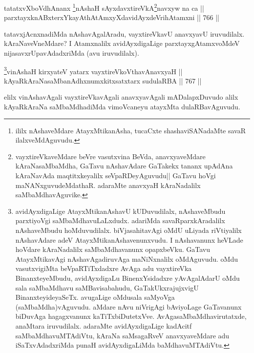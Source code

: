 
\begin{shl}
tatatxvXboVdhAnanx \footnote{ililx nAshaveMdare AtayxMtikanAsha, tucaCxte shashaviSANadaMte savaR ilalxveMdAguvudu.}nAshaH sAyxdavxtireVkA\footnote{vayxtireVkaveMdare beVre vasutxvina BeVda, anavxyaveMdare kAraNasaMbaMdha, GaTavu nAshavAdare GaTakekx tananx upAdAna kAraNavAda maqtitxkeyalilx seVpaRDeyAguvudu|| GaTavu hoVgi maNANxguvudeMdathaR. adaraMte anavxyaH kAraNadalilx saMbaMdhavAguvike.}navxyw na ca || \\
parxtayxknABxterxYkayAthAtAmxyXdavidAyxdeVrihA\s \s tamxni \hfill || 766 ||  
\end{shl}

\begin{artha} 
tatavxjAcnxnadiMda nAshavAgalAradu, vayxtireVkavU anavxyavU iruvudilalx. kAraNaveVneMdare? I Atamxnalilx avidAyxdigaLige parxtayxgAtamxvoMdeV nijasavxrUpavAdadxriMda (avu iruvudilalx).
\end{artha}


\begin{shl}
\footnote{avidAyxdigaLige AtayxMtikanAshavU kUDuvudilalx, nAshaveMbudu parxtiyoVgi saMbaMdhavuLaLxdudx. adariMda savaRparxkAradalilx nAshaveMbudu hoMduvudilalx. biVjasahitavAgi oMdU uLiyada riVtiyalilx nAshavAdare adeV AtayxMtikanAshavenunxvudu. I nAshavanunx heVLade hoVdare kAraNadalilx saMbaMdhavanunx opapxbeVku. GaTavu AtayxMtikavAgi nAshavAgadiruvAga maNiNxnalilx oMdAguvudu. oMdu vasutxvigiMta beVpaRTiTxdadxre AvAga adu vayxtireVka BinanxteyeMbudu, avidAyxdigaLu BinenxYsidadxre yAvAgalAdarU oMdu sala saMbaMdhavu saMBavisabahudu, GaTakUkx\break rajujxvigU BinanxteyideyaSeTx. avugaLige oMdusala saMyoVga (saMbaMdha)vAguvudu. aMdare nAvu niVrigAgi bAviyoLage GaTavanunx biDuvAga hagagxvanunx kaTiTxbiDutetxVve. AvAga\break saMbaMdhavirutatxde, anaMtara iruvudilalx. adaraMte avidAyxdigaLige kadAcitf saMbaMdha\-vuMTAdiVtu, kAraNa saMsagaRveV anavxyaveMdare adu iSaTxvAdadxriMda punaH avidAyxdigaLiMda baMdha\-vuMTAdiVtu.}vinAshaH kirxyateV yatarx vayxtireVkoV\s thavA\s navxyaH ||  \\
kAyaRkAraNasaMbanAdhxnumxkitxsatxtarx sudulaRBA \hfill || 767 ||  
\end{shl}

\begin{artha} 
elilx vinAshavAgali vayxtireVkavAgali anavxyavAgali mADalapxDu\-vudo alilx kAyaRkAraNa saMbaMdhadiMda vimoVcaneyu atayxMta dulaRBavAguvudu.
\end{artha}

